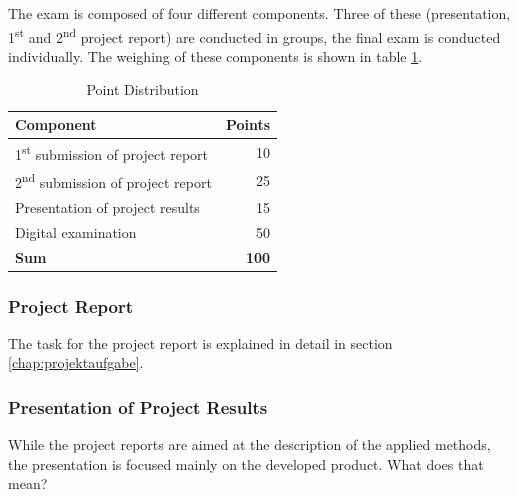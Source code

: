 \documentclass[headinclude=true]{scrartcl}
\begin{document}
The exam is composed of four different components. Three of these (presentation, 1\textsuperscript{st} and 2\textsuperscript{nd} project report) are conducted in groups, the final exam is conducted individually. The weighing of these components is shown in table \ref{tab:komponenten}.

\begin{table} \centering
 \caption{Point Distribution}
 \label{tab:komponenten}
 \begin{tabular}{lr}
  \toprule
  Component & Points \\ \midrule
  1\textsuperscript{st} submission of project report & 10 \\ 
  2\textsuperscript{nd} submission of project report & 25 \\ 
  Presentation of project results & 15 \\ 
  Digital examination & 50 \\ \midrule
  \textbf{Sum} & \textbf{100} \\ \bottomrule
 \end{tabular}
\end{table}

\subsubsection{Project Report}

The task for the project report is explained in detail in section \ref{chap:projektaufgabe}.


\subsubsection{Presentation of Project Results}

While the project reports are aimed at the description of the applied methods, the presentation is focused mainly on the developed product. What does that mean?
\end{document}
